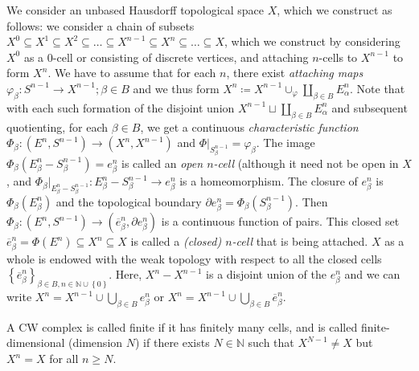 \documentclass[a4paper,11pt]{article}
\newcommand{\lb}{\left(}
\newcommand{\rb}{\right)}
\newcommand{\lc}{\left\lbrace}
\newcommand{\rc}{\right\rbrace}
\newcommand{\F}{\Phi}
\renewcommand{\a}{\alpha}
\renewcommand{\b}{\beta}
\newcommand{\f}{\varphi}
\newcommand{\naturals}{\mathbb{N}}
\newcommand{\tends}{\rightarrow}
\begin{document}
We consider an unbased Hausdorff topological space $X$, which we construct as follows: we consider a chain of subsets $X^0\subseteq X^1\subseteq X^2\subseteq \dots\subseteq X^{n-1}\subseteq X^n\subseteq\dots\subseteq X$, which we construct by considering $X^0$ as a $0$-cell or consisting of discrete vertices, and attaching $n$-cells to $X^{n-1}$ to form $X^n$. We have to assume that for each $n$, there exist \emph{attaching maps} $\f_\b:S^{n-1}\tends X^{n-1};\b\in B$ and we thus form $X^n\coloneq X^{n-1}\cup_\f \displaystyle\coprod_{\b\in B}E_\a^{n}$. Note that with each such formation of the disjoint union $X^{n-1}\sqcup  \displaystyle\coprod_{\b\in B}E_\a^{n}$ and subsequent quotienting, for each $\b\in B$, we get a continuous \emph{characteristic function} $\F_\b:\lb E^n, S^{n-1}\rb\tends \lb X^n, X^{n-1}\rb$ and $\F\vert_{S_\b^{n-1}}=\f_\b$. The image $\F_\b\lb E_\b^{n}-S_\b^{n-1}\rb=e_\b^n$ is called an \emph{open $n$-cell} (although it need not be open in $X$, and $\F_\b\vert_{E_\b^{n}-S_\b^{n-1}}: E_\b^{n}-S_\b^{n-1}\tends e_\b^n$ is a homeomorphism. The closure of $e_\b^n$ is $\F_\b\lb E_\b^n\rb$ and the topological boundary $\partial e_\b^n=\F_\b\lb S_\b^{n-1}\rb$. Then $\F_\b:\lb E^n, S^{n-1}\rb\tends \lb \overline{e}_\b^n, \partial e_\b^n\rb$ is a continuous function of pairs. This closed set $\overline{e}_\b^n=\F\lb E^n\rb\subseteq X^n\subseteq X$ is called a \emph{(closed) $n$-cell} that is being attached. $X$ as a whole is endowed with the weak topology with respect to all the closed cells $\lc \overline{e}_\b^n\rc_{\b\in B,n\in\naturals\cup\lc 0\rc}$. Here, $X^n-X^{n-1}$ is a disjoint union of the $e_\b^n$ and we can write $\displaystyle X^n=X^{n-1}\cup\bigcup_{\b\in B}e_\b^n$ or $\displaystyle X^n=X^{n-1}\cup\bigcup_{\b\in B}\overline{e}_\b^n$.

A CW complex is called finite if it has finitely many cells, and is called finite-dimensional (dimension $N$) if there exists $N\in\naturals$ such that $X^{N-1}\neq X$ but $X^n=X$ for all $n\geq N$.

\end{document}
